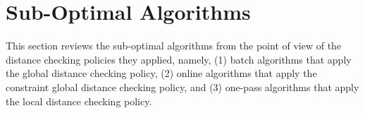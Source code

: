 \newtheorem{theorem}{Theorem}
\newtheorem{lemma}{Lemma}

\section{Sub-Optimal Algorithms}
\label{sec-subopt}



This section reviews the sub-optimal \lsa algorithms from the point of view of the distance checking policies they applied, namely, (1) batch algorithms that apply the global distance checking policy, (2) online algorithms that apply the constraint global distance checking policy, and (3) one-pass algorithms that apply the local distance checking policy.









